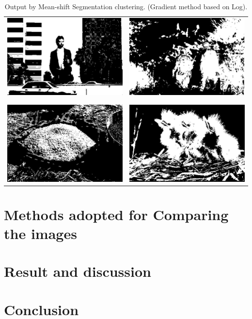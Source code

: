 \documentclass{article}
\begin{document}
\begin{center}
\begin{table}
\begin{tabular}{c| c}
\includegraphics[scale = 0.7]{kmean_1} & \includegraphics[scale = 0.7]{kmean_2}\\
\\\hline\\
\includegraphics[scale = 0.7]{kmean_3} & \includegraphics[scale = 0.7]{kmean_4}\\
\end{tabular}
\caption{Output by Mean-shift Segmentation clustering. (Gradient method based on Log).}
\label{table:4}
\end{table}
\end{center}







\section{Methods adopted for Comparing the images}
\section{Result and discussion}
\section{Conclusion}
\end{document}
